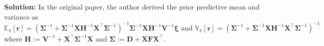 \documentclass[11pt]{article}
\theoremstyle{plain} %
\newenvironment{solution}
{\color{C2}\normalfont\begin{framed}\begingroup\textbf{Solution:} }
  {\endgroup\end{framed}}
\theoremstyle{remark}
\newenvironment{remark}
  {\pushQED{\qed}\renewcommand{\qedsymbol}{$\triangle$}\remarkx}
  {\popQED\endremarkx}
\begin{document}
\begin{solution}
  \begin{remark}
    In the original paper, the author derived the prior predictive mean and variance as
    $$
      \mathbb{E}_\pi[\boldsymbol{r}]
      =\left(\boldsymbol{\Sigma}^{-1}+\boldsymbol{\Sigma}^{-1} \boldsymbol{X} \boldsymbol{H}^{-1} \boldsymbol{X}^\top \boldsymbol{\Sigma}^{-1}\right)^{-1} \boldsymbol{\Sigma}^{-1} \boldsymbol{X} \boldsymbol{H}^{-1} \boldsymbol{V}^{-1} \boldsymbol{\xi}
      \text{ and }
      \mathbb{V}_\pi[\boldsymbol{r}]=\left(\boldsymbol{\Sigma}^{-1}+\boldsymbol{\Sigma}^{-1} \boldsymbol{X} \boldsymbol{H}^{-1} \boldsymbol{X}^\top \boldsymbol{\Sigma}^{-1}\right)^{-1}
    $$
    where $\boldsymbol{H}:=\boldsymbol{V}^{-1}+\boldsymbol{X}^\top \boldsymbol{\Sigma}^{-1} \boldsymbol{X}$ and $\boldsymbol{\Sigma}:=\boldsymbol{D}+\boldsymbol{X F} \boldsymbol{X}^\top$.


\end{remark}
\end{solution}
\end{document}
